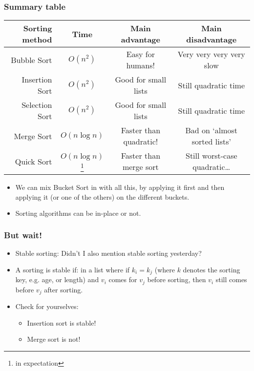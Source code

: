 \begin{frame}
	\frametitle{Summary table}
	\begin{tabular}{r | c | c | c}
		\small
		Sorting method & Time & Main advantage & Main disadvantage \\
		\midrule
		Bubble Sort & $O(n^2)$ & Easy for humans! &  Very very very very slow \\
		Insertion Sort & $O(n^2)$ & Good for small lists &  Still quadratic time \\
		Selection Sort & $O(n^2)$ & Good for small lists &  Still quadratic time \\
		Merge Sort & $O(n \log n)$ & Faster than quadratic! &  Bad on `almost sorted lists' \\
		Quick Sort & $O(n \log n)$\footnote{in expectation} & Faster than merge sort &  Still worst-case quadratic\dots \\
	\end{tabular}
	\begin{itemize}
		\item We can mix Bucket Sort in with all this, by applying it first and then applying it (or one of the others) on
			the different buckets.
		\item Sorting algorithms can be in-place or not.
	\end{itemize}
\end{frame}

\begin{frame}
	\frametitle{But wait!}
	
	\begin{itemize}
		\item Stable sorting: Didn't I also mention stable sorting yesterday?
		\item A sorting is stable if: in a list where if $k_i = k_j$ (where $k$ denotes the sorting key,
			e.g. age, or length) and $v_i$ comes for $v_j$ before sorting, then $v_i$ still comes before $v_j$ after sorting.
		\item Check for yourselves:
	\begin{itemize}
		\item Insertion sort is stable!
		\item Merge sort is not!
			\end{itemize}

			\end{itemize}	
\end{frame}